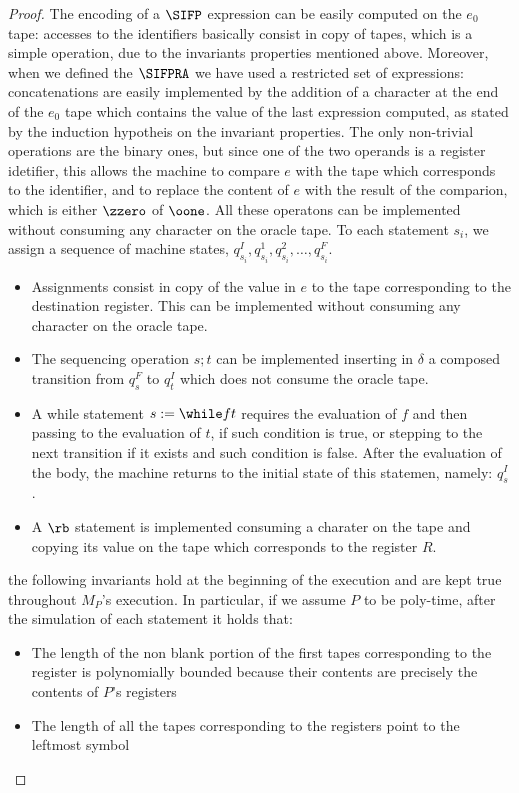 \begin{proof}
The encoding of a $\SIFP$ expression can be easily computed on the $e_0$ tape:
accesses to the identifiers basically consist in copy of tapes, which is a simple operation,
due to the invariants properties mentioned above.
Moreover, when we defined the $\SIFPRA$ we have used a restricted set of expressions:
concatenations are easily implemented by the addition of a character at the
end of the $e_0$ tape which contains the value of the last expression computed,
as stated by the induction hypotheis on the invariant properties.
The only non-trivial operations are the binary ones, but since one of the
two operands is a register idetifier, this allows the machine to compare $e$
with the tape which corresponds to the identifier, and to replace the content of $e$
with the result of the comparion, which is either $\zzero$ of $\oone$.
All these operatons can be implemented without consuming any character
on the oracle tape.
%
To each statement $s_i$, we assign a sequence of machine states,
$q_{s_i}^I, q_{s_i}^1, q_{s_i}^2, \ldots, q_{s_i}^F$.
%
\begin{itemize}
  \item Assignments consist in copy of the value in $e$ to the tape corresponding to
  the destination register. This can be implemented without consuming any character
  on the oracle tape.
  \item The sequencing operation $s;t$ can be implemented inserting in $\delta$
  a composed transition from $q_s^F$ to $q_t^I$ which does not consume the oracle tape.
  \item A while statement $s:= \while f t$ requires the evaluation of $f$ and
  then passing to the evaluation of $t$, if such condition is true, or stepping
  to the next transition if it exists and such condition is false.
  After the evaluation of the body, the machine returns to the initial state of
  this statemen, namely: $q_s^I$.
  \item A $\rb$ statement is implemented consuming a charater on the tape and copying
  its value on the tape which corresponds to the register $R$.
\end{itemize}

the following invariants hold at the beginning of the execution and are kept true
throughout $M_P$'s execution. In particular, if we assume $P$ to be poly-time,
after the simulation of each statement it holds that:

\begin{itemize}
  \item The length of the non blank portion of the first tapes corresponding to
  the register is polynomially bounded because their contents are precisely
  the contents of $P$'s registers
  \item The length of all the tapes corresponding to the registers point to the
  leftmost symbol
\end{itemize}


\end{proof}
